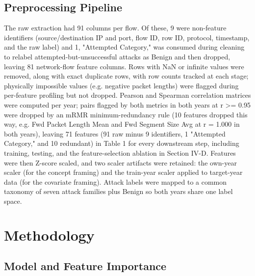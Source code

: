 \documentclass[conference]{IEEEtran}
\begin{document}
\subsection{Preprocessing Pipeline}

The raw extraction had 91 columns per flow. Of these, 9 were non-feature identifiers (source/destination IP and port, flow ID, row ID, protocol, timestamp, and the raw label) and 1, "Attempted Category," was consumed during cleaning to relabel attempted-but-unsuccessful attacks as Benign and then dropped, leaving 81 network-flow feature columns. Rows with NaN or infinite values were removed, along with exact duplicate rows, with row counts tracked at each stage; physically impossible values (e.g. negative packet lengths) were flagged during per-feature profiling but not dropped. Pearson and Spearman correlation matrices were computed per year; pairs flagged by both metrics in both years at r >= 0.95 were dropped by an mRMR minimum-redundancy rule (10 features dropped this way, e.g. Fwd Packet Length Mean and Fwd Segment Size Avg at r = 1.000 in both years), leaving 71 features (91 raw minus 9 identifiers, 1 "Attempted Category," and 10 redundant) in Table 1 for every downstream step, including training, testing, and the feature-selection ablation in Section IV-D. Features were then Z-score scaled, and two scaler artifacts were retained: the own-year scaler (for the concept framing) and the train-year scaler applied to target-year data (for the covariate framing). Attack labels were mapped to a common taxonomy of seven attack families plus Benign so both years share one label space.
\par\medskip

\section{Methodology}

\subsection{Model and Feature Importance}
\end{document}

